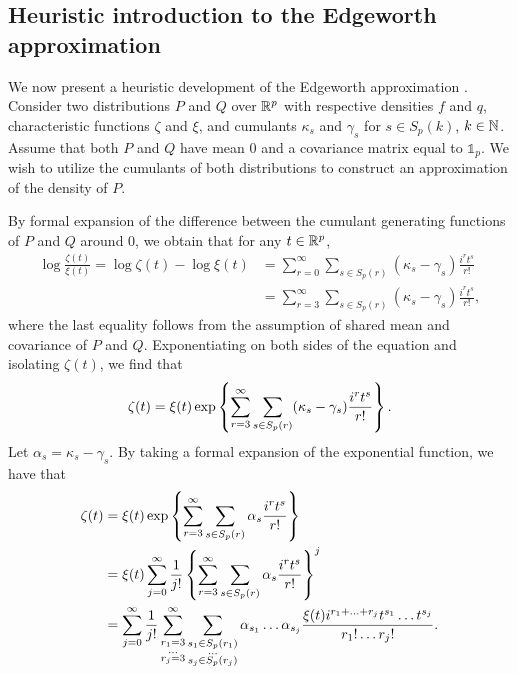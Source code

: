 \subsection{Heuristic introduction to the Edgeworth approximation} \label{sec-edgeworth}

We now present a heuristic development of the Edgeworth approximation \cite{edg}. Consider two distributions $P$ and $Q$ over ${\mathbb{R}^p}$ with respective densities $f$ and $q$, characteristic functions $\zeta$ and $\xi$, and cumulants $\kappa_s$ and $\gamma_s$ for $s \in S_p(k)$, $k \in \mathbb{N}$. Assume that both $P$ and $Q$ have mean $0$ and a covariance matrix equal to $\mathbb{1}_p$. We wish to utilize the cumulants of both distributions to construct an approximation of the density of $P$.

By formal expansion of the difference between the cumulant generating functions of $P$ and $Q$ around 0, we obtain that for any $t \in {\mathbb{R}^p}$,
\begin{align*}
    \log \frac{\zeta(t)}{\xi(t)}
    = \log \zeta(t) - \log \xi(t) 
    &= \sum_{r=0}^\infty \sum_{s \in S_p(r)} (\kappa_s - \gamma_s)\frac{i^r t^s}{r!}\\
    &= \sum_{r=3}^\infty \sum_{s \in S_p(r)} (\kappa_s - \gamma_s)\frac{i^r t^s}{r!},
\end{align*}
where the last equality follows from the assumption of shared mean and covariance of $P$ and $Q$. Exponentiating on both sides of the equation and isolating $\zeta(t)$, we find that
\begin{equation*}
    \zeta(t) = \xi(t)\exp\left\{\sum_{r=3}^\infty \sum_{s \in S_p(r)} (\kappa_s - \gamma_s)\frac{i^r t^s}{r!}\right\}.
\end{equation*}
Let $\alpha_s = \kappa_s - \gamma_s$. By taking a formal expansion of the exponential function, we have that
\begin{align*}
    \zeta(t)
    &= \xi(t)\exp\left\{\sum_{r=3}^\infty \sum_{s \in S_p(r)} \alpha_s\frac{i^r t^s}{r!}\right\}\\
    &= \xi(t)\sum_{j=0}^\infty \frac{1}{j!} \left\{\sum_{r=3}^\infty \sum_{s \in S_p(r)} \alpha_s\frac{i^r t^s}{r!}\right\}^j \\
    &=
    \sum_{j=0}^\infty \frac{1}{j!} 
    \sum_{\substack{r_1 = 3\\ \ldots \\r_j = 3}}^\infty
    \sum_{\substack{s_1 \in S_p(r_1)\\ \ldots \\s_j \in S_p(r_j)}}
    \alpha_{s_1}\ldots\alpha_{s_j}
    \frac{
        \xi(t) i^{r_1 + \ldots + r_j}
        t^{s_1} \ldots t^{s_j}
    }{
        r_1! \ldots r_j!
    }.
\end{align*}
